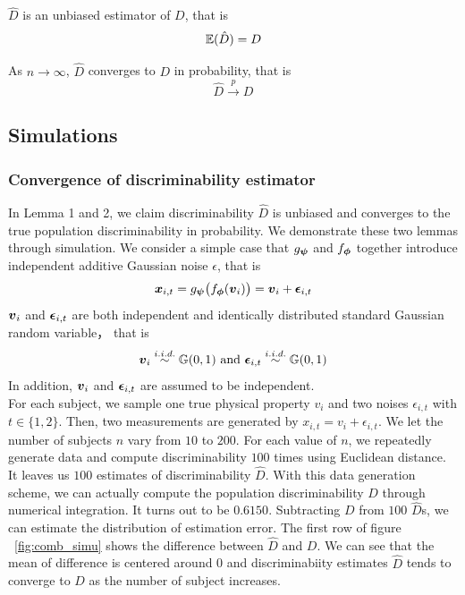 \documentclass{article}
\begin{document}
\begin{lem}	
	$\hat{D}$ is an unbiased estimator of $D$, that is
	\[ \mathbb{E}(\hat{D}) = D\]
\end{lem}

\begin{lem}	
	As $n \rightarrow \infty$, $\hat{D}$ converges to $D$ in probability, that is
	\[\hat{D} \overset{p}{\rightarrow} D \]
\end{lem}



\subsection{Simulations}
\subsubsection{Convergence of discriminability estimator}
In Lemma 1 and 2, we claim discriminability $\hat{D}$ is unbiased and converges to  the true population discriminability in probability. We demonstrate these two lemmas through simulation. We consider a simple case that $g_{\boldsymbol{\psi}}$ and $f_{\boldsymbol{\phi}}$ together introduce independent additive Gaussian noise $\epsilon$, that is
\begin{equation}
\boldsymbol{x}_{i,t} =g_{\boldsymbol{\psi}} \big(f_{\boldsymbol{\phi}} (\boldsymbol{v}_i) \big) =\boldsymbol{v}_{i} + \boldsymbol{\epsilon}_{i,t}
\end{equation}  
$\boldsymbol{v}_{i}$ and $\boldsymbol{\epsilon}_{i,t}$ are both independent and identically distributed standard Gaussian random variable， that is 
\[\boldsymbol{v}_i \overset{i.i.d.}{\sim} \mathbb{G}(0,1) \text{ and  }\boldsymbol{\epsilon}_{i,t} \overset{i.i.d.}{\sim} \mathbb{G}(0,1)\] 
In addition, $\boldsymbol{v}_{i}$ and $\boldsymbol{\epsilon}_{i,t}$ are assumed to be independent. \\
For each subject, we sample one true physical property $v_i$ and two noises $\epsilon_{i,t}$ with $t\in\{1,2\}$. Then, two measurements are generated by $x_{i,t} = v_{i} + \epsilon_{i,t}$. We let the number of subjects $n$ vary from $10$ to $200$. For each value of $n$, we repeatedly generate data and compute discriminability $100$ times using Euclidean distance. It leaves us $100$ estimates of discriminability $\hat{D}$. With this data generation scheme, we can actually compute the population discriminability $D$ through numerical integration. It turns out to be $0.6150$. Subtracting $D$ from $100$ $\hat{D}$s, we can estimate the distribution of estimation error. The first row of figure ~\ref{fig:comb_simu} shows the difference between $\hat{D}$ and $D$. We can see that the mean of difference is centered around 0 and  discriminabiity estimates $\hat{D}$ tends to converge to $D$ as the number of subject increases.
\end{document}
